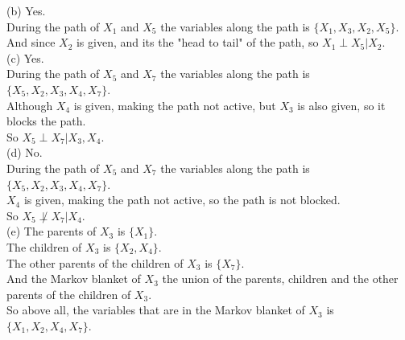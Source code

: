 \documentclass[10pt]{article}
\begin{document}
\begin{enumerate}[1.]
		(b) Yes.\\
		During the path of $X_1$ and $X_5$ the variables along the path is $\{X_1,X_3,X_2,X_5\}$.\\
		And since $X_2$ is given, and its the "head to tail" of the path, so $X_1\perp X_5|X_2$.\\

		(c) Yes.\\
		During the path of $X_5$ and $X_7$ the variables along the path is $\{X_5,X_2,X_3,X_4,X_7\}$.\\
		Although $X_4$ is given, making the path not active, but $X_3$ is also given, so it blocks the path.\\
		So $X_5\perp X_7|X_3,X_4$.\\

		(d) No.\\
		During the path of $X_5$ and $X_7$ the variables along the path is $\{X_5,X_2,X_3,X_4,X_7\}$.\\
		$X_4$ is given, making the path not active, so the path is not blocked.\\
		So $X_5\not\perp X_7|X_4$.\\

		(e) The parents of $X_3$ is $\{X_1\}$.\\
		The children of $X_3$ is $\{X_2,X_4\}$.\\
		The other parents of the children of $X_3$ is $\{X_7\}$.\\
		And the Markov blanket of $X_3$ the union of the parents, children and the other parents of the children of $X_3$.\\

		So above all, the variables that are in the Markov blanket of $X_3$ is $\{X_1,X_2,X_4,X_7\}$.

\end{enumerate}
\end{document}
